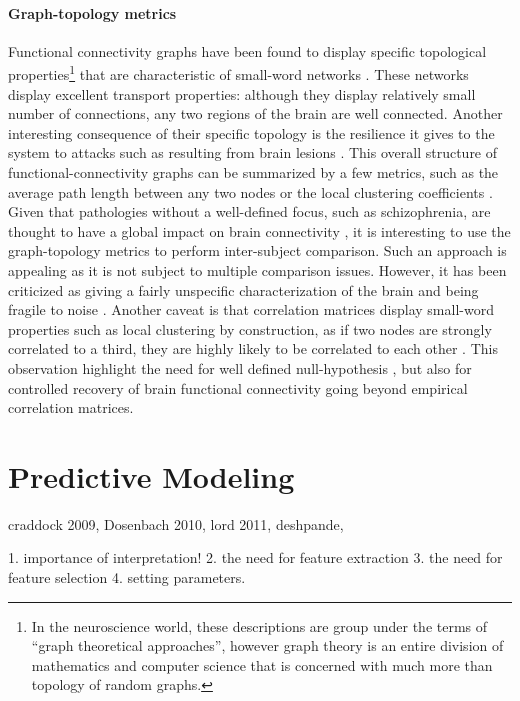 \documentclass[5p]{elsarticle}
\begin{document}
\paragraph{Graph-topology metrics}
%
Functional connectivity graphs have been found to display specific
topological properties\footnote{In the neuroscience world, these
descriptions are group under the terms of ``graph theoretical
approaches'', however graph theory is an entire division of mathematics
and computer science that is concerned with much more than topology of
random graphs.} that are characteristic of small-word networks
\cite{stam2004,salvador2005,achard2006,bullmore2009}. These networks
display excellent transport properties: although they display relatively
small number of connections, any two regions of the brain are well
connected. Another interesting consequence of their specific topology is
the resilience it gives to the system to attacks such as resulting from
brain lesions \cite{achard2006}. This overall structure of
functional-connectivity graphs can be summarized by a few metrics, such
as the average path length between any two nodes or the local clustering
coefficients \cite{rubinov2010}. Given that pathologies without a well-defined focus, such
as schizophrenia, are thought to have a global impact on brain
connectivity \cite{liu2008,bassett2008}, it is interesting to use the
graph-topology metrics to perform inter-subject comparison. Such an
approach is appealing as it is not subject to multiple comparison issues.
However, it has been criticized as giving a fairly unspecific
characterization of the brain and being fragile to noise
\cite{ioannides2007}. Another caveat is that correlation matrices display
small-word properties such as local clustering by construction, as if two
nodes are strongly correlated to a third, they are highly likely to be
correlated to each other \cite{zalesky2012}. This observation highlight
the need for well defined null-hypothesis \cite{zalesky2012,rubinov2011},
but also for controlled recovery of brain functional connectivity going
beyond empirical correlation matrices.


\section{Predictive Modeling}
craddock 2009, Dosenbach 2010, lord 2011, deshpande, 

1. importance of interpretation!
2. the need for feature extraction
3. the need for feature selection
4. setting parameters.
\end{document}
